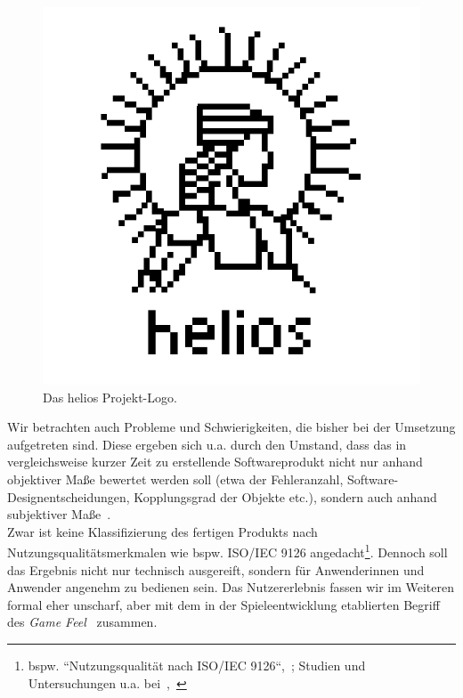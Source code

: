 \begin{figure}[!h]
    \centering
    \includegraphics[width=0.5\columnwidth]{img/helios_logo}
    \caption{Das helios Projekt-Logo.}
    \label{fig:helios_logo}
\end{figure}


Wir betrachten auch Probleme und Schwierigkeiten, die bisher bei der Umsetzung aufgetreten sind.
Diese ergeben sich u.a. durch den Umstand, dass das in vergleichsweise kurzer Zeit zu erstellende Softwareprodukt nicht nur anhand objektiver Maße bewertet werden soll (etwa der Fehleranzahl, Software-Designentscheidungen, Kopplungsgrad der Objekte etc.), sondern auch anhand subjektiver Maße~\cite[385]{Bal08}.\\
Zwar ist keine Klassifizierung des fertigen Produkts nach Nutzungsqualitätsmerkmalen wie bspw. ISO/IEC 9126 angedacht\footnote{bspw. ``Nutzungsqualität nach ISO/IEC 9126``,~\cite[466]{Bal08}; Studien und Untersuchungen u.a. bei~\cite[]{AZMK17},~\cite[]{Ber10}}.
Dennoch soll das Ergebnis nicht nur technisch ausgereift, sondern für Anwenderinnen und Anwender angenehm zu bedienen sein.
Das Nutzererlebnis fassen wir im Weiteren formal eher unscharf, aber mit dem in der Spieleentwicklung etablierten Begriff des \textit{Game Feel}~\cite[]{Swi08} zusammen.
